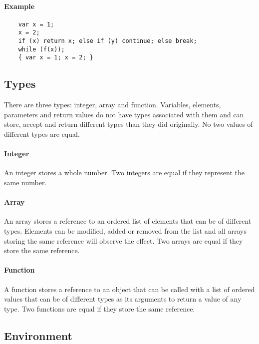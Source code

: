\documentclass[12pt, a4paper]{article}
\begin{document}
\paragraph{Example}

\begin{verbatim}
    var x = 1;
    x = 2;
    if (x) return x; else if (y) continue; else break;
    while (f(x));
    { var x = 1; x = 2; }
\end{verbatim}

\subsection{Types}

There are three types: integer, array and function. Variables, elements, parameters and return values do not have types associated with them and can store, accept and return different types than they did originally. No two values of different types are equal.

\paragraph{Integer}

An integer stores a whole number. Two integers are equal if they represent the same number.

\paragraph{Array}

An array stores a reference to an ordered list of elements that can be of different types. Elements can be modified, added or removed from the list and all arrays storing the same reference will observe the effect. Two arrays are equal if they store the same reference.

\paragraph{Function}

A function stores a reference to an object that can be called with a list of ordered values that can be of different types as its arguments to return a value of any type. Two functions are equal if they store the same reference.

\subsection{Environment}
\end{document}
